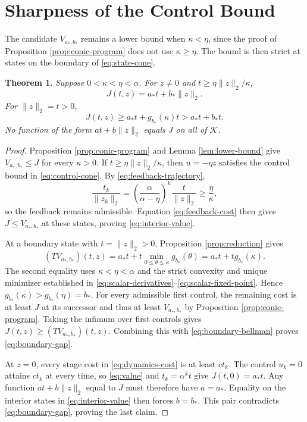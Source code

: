 \documentclass[10pt]{article}
\newtheorem{theorem}{Theorem}
\begin{document}
\section{Sharpness of the Control Bound}

The candidate $V_{a_*,b_*}$ remains a lower bound when $\kappa<\eta$, since the proof of Proposition \ref{prop:conic-program} does not use $\kappa\geq\eta$. The bound is then strict at states on the boundary of \eqref{eq:state-cone}.

\begin{theorem}
\label{thm:threshold}
Suppose $0<\kappa<\eta<\alpha$. For $z\ne0$ and $t\geq\eta\|z\|_2/\kappa$,
\begin{equation}
J(t,z)=a_*t+b_*\|z\|_2.
\label{eq:interior-value}
\end{equation}
For $\|z\|_2=t>0$,
\begin{equation}
J(t,z)\geq a_*t+g_{b_*}(\kappa)t
>a_*t+b_*t.
\label{eq:boundary-gap}
\end{equation}
No function of the form $a t+b\|z\|_2$ equals $J$ on all of $\mathcal K$.
\end{theorem}

\begin{proof}
Proposition \ref{prop:conic-program} and Lemma \ref{lem:lower-bound} give $V_{a_*,b_*}\leq J$ for every $\kappa>0$. If $t\geq\eta\|z\|_2/\kappa$, then $u=-\eta z$ satisfies the control bound in \eqref{eq:control-cone}. By \eqref{eq:feedback-trajectory},
\begin{equation}
\frac{t_k}{\|z_k\|_2}
=\left(\frac{\alpha}{\alpha-\eta}\right)^k
\frac{t}{\|z\|_2}
\geq\frac{\eta}{\kappa},
\label{eq:ratio-growth}
\end{equation}
so the feedback remains admissible. Equation \eqref{eq:feedback-cost} then gives $J\leq V_{a_*,b_*}$ at these states, proving \eqref{eq:interior-value}.

At a boundary state with $t=\|z\|_2>0$, Proposition \ref{prop:reduction} gives
\begin{equation}
(TV_{a_*,b_*})(t,z)
=a_*t+t\min_{0\leq\theta\leq\kappa}g_{b_*}(\theta)
=a_*t+t g_{b_*}(\kappa).
\label{eq:boundary-bellman}
\end{equation}
The second equality uses $\kappa<\eta<\alpha$ and the strict convexity and unique minimizer established in \eqref{eq:scalar-derivatives}--\eqref{eq:scalar-fixed-point}. Hence $g_{b_*}(\kappa)>g_{b_*}(\eta)=b_*$. For every admissible first control, the remaining cost is at least $J$ at its successor and thus at least $V_{a_*,b_*}$ by Proposition \ref{prop:conic-program}. Taking the infimum over first controls gives $J(t,z)\geq(TV_{a_*,b_*})(t,z)$. Combining this with \eqref{eq:boundary-bellman} proves \eqref{eq:boundary-gap}.

At $z=0$, every stage cost in \eqref{eq:dynamics-cost} is at least $c t_k$. The control $u_k=0$ attains $c t_k$ at every time, so \eqref{eq:value} and $t_k=\alpha^k t$ give $J(t,0)=a_*t$. Any function $a t+b\|z\|_2$ equal to $J$ must therefore have $a=a_*$. Equality on the interior states in \eqref{eq:interior-value} then forces $b=b_*$. This pair contradicts \eqref{eq:boundary-gap}, proving the last claim.
\end{proof}
\end{document}

